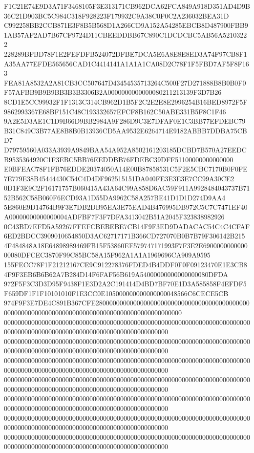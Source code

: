 \documentclass[UTF8,fontset=fandol,zihao=-4,a4paper]{ctexart}
\begin{document}
{{F1C21E74E9D3A71F3468105F3E313171CB962DCA62FCA849A918D351AD4D9B36C21D903BC5C984C318F928223F179932C9A38C0F0C2A236032BEA31D
C992258BB2CCB871E3F8B5B568D1A266CD9A152A54285EBCB8D487900FBB91AB57AF2AD7B67CF9724D11CBEEDDBB67C890C1DCDCBC5AB56A52103222
228289BFBD78F1E2FEFDFB524072DFBE7DCA5E6A8E8E8ED3A74F97CB8F1A35AA77EFDE565656CAD1C4414141A1A1A1CA08D2C78F1F5FBD7AF5F8F163
FEA81A8532A2A81CB3CC507647D43454535713264C500F27D271888B8B0B0F0F57AFBB9B9B9BB3B3B3306B2A0000000000000080211213139F3D7B26
8CD1E5CC99932F1F1313C314CB962D1B5F2C2E2E8E2996254B16BED8972F5F9862993367E68BF151C48C193332657EFCF8B162C50ABE331B5F8C1F46
9A2E5D3AE1C1D9B66D9BB2984A9F286D9C3E7DFAF0E1C3BB77EFDEBC79B31C849C3B77AE8B8B0B13936CD5AA9532E6264714E9182ABBB7DDBA75CBD7
D79759560A033A3939A9849BAA54A952A8502161203185DCBD7B570A27EEDCB9535364920C1F3EBC5BB76EEDDBB76FDEBC39DFF51100000000000000
E0BFEAC78F1FB76EDDE20374050A14E00B87858531C5F2E5CBC7170B0F0FE7E779E38B45444430C54C4D4DF962515151DA040FE3E3E3E7CC99A30CE2
0D1F3E9C2F16171757B060415A43A64C99A858D6AC59F911A9928484043737B7152B562C58B060F6ECD93A1D55DA9962C58A257BE41D1D1D274D9AA4
5E860E9D14764B9F3E7DB2DB95EA3E75EAD4B476995DB972C5C7C7471EF40A00000000000000004ADFBF7F3F7DFA3413042B51A2045F323838982926
0C43BD7EFD5A59267FFEFCBEBEBE7CB14F9F3ED9DADACAC54C4C4CFAF6ED2BDCC3909010654850D3AC62717171B366CD727070B0B7B79F306142B215
4F484848A18E64898989469FB15F53860EE579747171993F7F3E2E690000000000000080DFCEC3870F99C85BC58A15F962A1A1A1969696CA909A9595
155FECC78F1F21212167CE9C912278376FDED4B4DDF0F0F09123470E1E3CB84F9F3EB6B6B62A7B284D14F6FAF56B619A54000000000000000080DFDA
972F5F3C3D3D95F9438F1E3D2A2C191414D4BD7BF70E1D3A585858F4EFDF5F659DF1F1F10101010F1E3CC0E105000000000000000048566C6CECE5CB
974F9F3E7DE4C891B367CFE2800000000000000000000000000000000000000000000000000000000000000000000000000000000000000000000000
000000000000000000000000000000000000000000000000000000000000000000000000000000000000000000000000000000000000000000000000
000000000000000000000000000000000000000000000000000000000000000000000000000000000000000000000000000000000000000000000000
000000000000000000000000000000000000000000000000000000000000000000000000000000000000000000000000000000000000000000000000
000000000000000000000000000000000000000000000000000000000000000000000000000000000000000000000000000000000000000000000000
000000000000000000000000000000000000000000000000000000000000000000000000000000000000000000000000000000000000000000000000
000000000000000000000000000000000000000000000000000000000000000000000000000000000000000000000000000000000000000000000000
000000000000000000000000000000000000000000000000000000000000000000000000000000000000000000000000000000000000000000000000
}}
\end{document}
